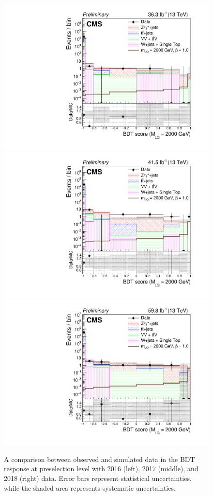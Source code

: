 \begin{figure}[H]
    {\includegraphics[width=.32\textwidth]{Images/Analysis/Results_2016_Unblinded/Plots/Preselection/BasicLQ_uujj_LQToBMu_pair_uubj_BDT_discrim_M2000_standard.pdf}}
    {\includegraphics[width=.32\textwidth]{Images/Analysis/Results_2017_Unblinded/Plots/Preselection/BasicLQ_uujj_LQToBMu_pair_uubj_BDT_discrim_M2000_standard.pdf}}
    {\includegraphics[width=.32\textwidth]{Images/Analysis/Results_2018_Unblinded/Plots/Preselection/BasicLQ_uujj_LQToBMu_pair_uubj_BDT_discrim_M2000_standard.pdf}}
    \caption{A comparison between observed and simulated data in the BDT response at preselection level with 2016 (left), 2017 (middle), and 2018 (right) data. Error bars represent statistical uncertainties, while the shaded area represents systematic uncertainties.}
    \label{figapp:BDT1800to2000}
\end{figure}

